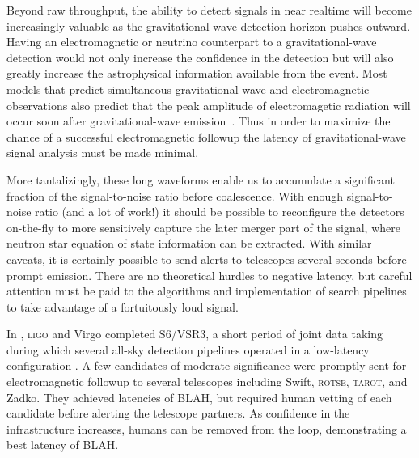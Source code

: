 Beyond raw throughput, the ability to detect signals in near realtime will
become increasingly valuable as the gravitational-wave detection horizon pushes
outward. Having an electromagnetic or neutrino counterpart to a
gravitational-wave detection would not only increase the confidence in the
detection but will also greatly increase the astrophysical information
available from the event.  Most models that predict simultaneous gravitational-wave and
electromagnetic observations also predict that the peak amplitude of
electromagetic radiation will occur soon after gravitational-wave
emission~\cite{sylvestre2003}.  Thus in order
to maximize the chance of a successful electromagnetic followup the latency of
gravitational-wave signal analysis must be made minimal.

More tantalizingly, these long waveforms enable us to accumulate a significant
fraction of the signal-to-noise ratio before coalescence. With enough
signal-to-noise ratio (and a lot of work!) it should be possible to reconfigure
the detectors on-the-fly to more sensitively capture the later merger part of
the signal, where neutron star equation of state information can be extracted.
With similar caveats, it is certainly possible to send alerts to telescopes
several seconds before prompt emission. There are no theoretical hurdles to
negative latency, but careful attention must be paid to the algorithms and
implementation of search pipelines to take advantage of a fortuitously loud
signal.

In , \textsc{ligo} and Virgo completed S6/VSR3,
a short period of
joint data taking during which several all-sky detection pipelines operated in
a low-latency configuration \citeneeded. A few candidates of moderate
significance were promptly sent for electromagnetic followup \citeneeded{} to
several telescopes including Swift, \textsc{rotse}, \textsc{tarot}, and Zadko.
They achieved latencies of BLAH, but required human vetting of each candidate
before alerting the telescope partners. As confidence in the infrastructure
increases, humans can be removed from the loop, demonstrating a best latency
of BLAH.

